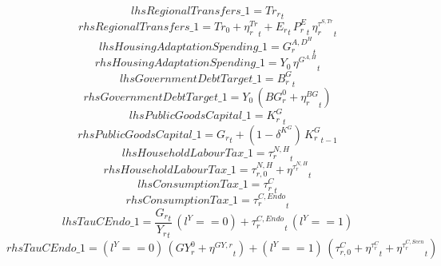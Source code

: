 \begin{dmath*}
lhsRegionalTransfers\_1 = {{Tr_r}}_{t}
\end{dmath*}
\begin{dmath*}
rhsRegionalTransfers\_1 = {{Tr_0}}+{{\eta^{Tr}_r}}_{t}+{{E_r}}_{t}\, {{P^E_r}}_{t}\, {{\eta^{\tau^{S,Tr}}_r}}_{t}
\end{dmath*}
\begin{dmath*}
lhsHousingAdaptationSpending\_1 = {{G^{A,D^H}_{r}}}_{t}
\end{dmath*}
\begin{dmath*}
rhsHousingAdaptationSpending\_1 = {{Y_0}}\, {{\eta^{G^{A,H}}}}_{t}
\end{dmath*}
\begin{dmath*}
lhsGovernmentDebtTarget\_1 = {{B^G_{r}}}_{t}
\end{dmath*}
\begin{dmath*}
rhsGovernmentDebtTarget\_1 = {{Y_0}}\, \left({{BG^0_r}}+{{\eta^{BG}_{r}}}_{t}\right)
\end{dmath*}
\begin{dmath*}
lhsPublicGoodsCapital\_1 = {{K^G_{r}}}_{t}
\end{dmath*}
\begin{dmath*}
rhsPublicGoodsCapital\_1 = {{G_{r}}}_{t}+\left(1-{{\delta^{K^{G}}}}\right)\, {{K^G_{r}}}_{t-1}
\end{dmath*}
\begin{dmath*}
lhsHouseholdLabourTax\_1 = {{\tau^{N,H}_{r}}}_{t}
\end{dmath*}
\begin{dmath*}
rhsHouseholdLabourTax\_1 = {{\tau^{N,H}_{r,0}}}+{{\eta^{\tau^{N,H}_{r}}}}_{t}
\end{dmath*}
\begin{dmath*}
lhsConsumptionTax\_1 = {{\tau^{C}_{r}}}_{t}
\end{dmath*}
\begin{dmath*}
rhsConsumptionTax\_1 = {{\tau^{C,Endo}_{r}}}_{t}
\end{dmath*}
\begin{dmath*}
lhsTauCEndo\_1 = \frac{{{G_{r}}}_{t}}{{{Y_r}}_{t}}\, \left({{l^{Y}}}==0\right)+{{\tau^{C,Endo}_{r}}}_{t}\, \left({{l^{Y}}}==1\right)
\end{dmath*}
\begin{dmath*}
rhsTauCEndo\_1 = \left({{l^{Y}}}==0\right)\, \left({{GY^0_r}}+{{\eta^{GY,r}}}_{t}\right)+\left({{l^{Y}}}==1\right)\, \left({{\tau^{C}_{r,0}}}+{{\eta^{\tau^C_{r}}}}_{t}+{{\eta^{\tau^{C,Scen}_{r}}}}_{t}\right)
\end{dmath*}
